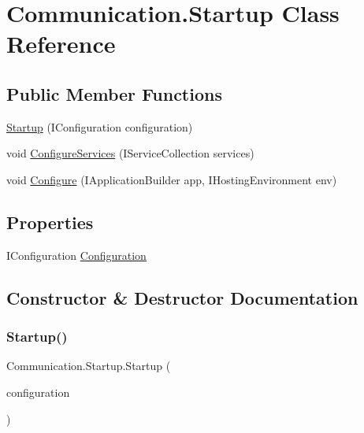 \hypertarget{class_communication_1_1_startup}{}\section{Communication.\+Startup Class Reference}
\label{class_communication_1_1_startup}
\subsection*{Public Member Functions}
\begin{DoxyCompactItemize}
\item 
\mbox{\hyperlink{class_communication_1_1_startup_acbe360990f13465b22be5261abfa83e0}{Startup}} (I\+Configuration configuration)
\item 
void \mbox{\hyperlink{class_communication_1_1_startup_a9e95f261ac4022f8ccbde0579e88f5f8}{Configure\+Services}} (I\+Service\+Collection services)
\item 
void \mbox{\hyperlink{class_communication_1_1_startup_a7dc3e759d9ba10ab8c26c9194e211e3f}{Configure}} (I\+Application\+Builder app, I\+Hosting\+Environment env)
\end{DoxyCompactItemize}
\subsection*{Properties}
\begin{DoxyCompactItemize}
\item 
I\+Configuration \mbox{\hyperlink{class_communication_1_1_startup_af9e7ee914d5371b00bc7f755a63ca7df}{Configuration}}
\end{DoxyCompactItemize}


\subsection{Constructor \& Destructor Documentation}
\mbox{\label{class_communication_1_1_startup_acbe360990f13465b22be5261abfa83e0}} 
\subsubsection{\texorpdfstring{Startup()}{Startup()}}
{\footnotesize\ttfamily Communication.\+Startup.\+Startup (\begin{DoxyParamCaption}\item[{I\+Configuration}]{configuration }\end{DoxyParamCaption})}



